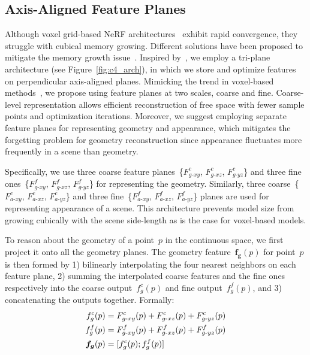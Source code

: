 \subsection{Axis-Aligned Feature Planes} \label{sec:c4_feat_planes}
Although voxel grid-based NeRF architectures~\citep{fridovich2022plenoxels, sun2022direct, wang2022go} exhibit rapid convergence, they struggle with cubical memory growing. Different solutions have been proposed to mitigate the memory growth issue~\citep{muller2022instant, Chen2022ECCV, chan2022efficient}. Inspired by~\cite{chan2022efficient}, we employ a tri-plane architecture (see Figure~\ref{fig:c4_arch}), in which we store and optimize features on perpendicular axis-aligned planes. Mimicking the trend in voxel-based methods~\citep{muller2022instant, sun2022direct, Chen2022ECCV}, we propose using feature planes at two scales, \ie coarse and fine. Coarse-level representation allows efficient reconstruction of free space with fewer sample points and optimization iterations. Moreover, we suggest employing separate feature planes for representing geometry and appearance, which mitigates the forgetting problem for geometry reconstruction since appearance fluctuates more frequently in a scene than geometry.

Specifically, we use three coarse feature planes~\{$F^{c}_{g\text{-}xy}$, $F^{c}_{g\text{-}xz}$, $F^{c}_{g\text{-}yz}$\} and three fine ones~\{$F^{f}_{g\text{-}xy}$, $F^{f}_{g\text{-}xz}$, $F^{f}_{g\text{-}yz}$\} for representing the geometry. Similarly, three coarse~\{$F^{c}_{a\text{-}xy}$, $F^{c}_{a\text{-}xz}$, $F^{c}_{a\text{-}yz}$\} and three fine~\{$F^{f}_{a\text{-}xy}$, $F^{f}_{a\text{-}xz}$, $F^{f}_{a\text{-}yz}$\} planes are used for representing appearance of a scene. This architecture prevents model size from growing cubically with the scene side-length as is the case for voxel-based models.

To reason about the geometry of a point~$p$ in the continuous space, we first project it onto all the geometry planes. The geometry feature~$\boldsymbol{f_{g}}(p)$ for point~$p$ is then formed by 1) bilinearly interpolating the four nearest neighbors on each feature plane, 2) summing the interpolated coarse features and the fine ones respectively into the coarse output~$f^{c}_{g}(p)$ and fine output~$f^{f}_{g}(p)$, and 3) concatenating the outputs together. Formally: 
\begin{align}
	f^{c}_{g}(p) &= F^{c}_{g\text{-}xy}(p) + F^{c}_{g\text{-}xz}(p) + F^{c}_{g\text{-}yz}(p) \notag \\
	f^{f}_{g}(p) &= F^{f}_{g\text{-}xy}(p) + F^{f}_{g\text{-}xz}(p) + F^{f}_{g\text{-}yz}(p) \notag \\
	\boldsymbol{f_{g}}(p) &= [f^{c}_{g}(p) ; f^{f}_{g}(p)]
\end{align}

